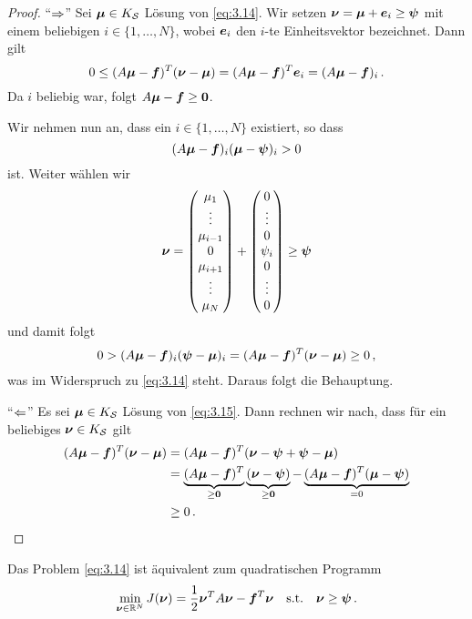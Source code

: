\begin{proof}
"`$\Rightarrow$"' Sei $\boldsymbol \mu \in K_{\mathcal S}$ Lösung von \eqref{eq:3.14}. Wir setzen $\boldsymbol\nu = \boldsymbol \mu +\boldsymbol e_i \ge \boldsymbol\psi$ mit einem beliebigen $i \in \{1,\ldots,N\}$, wobei $\boldsymbol e_i $ den $i$-te Einheitsvektor bezeichnet. Dann gilt
\[
	0 \le (A\boldsymbol\mu - \boldsymbol f)^T (\boldsymbol\nu - \boldsymbol\mu) = (A\boldsymbol\mu - \boldsymbol f)^T \boldsymbol e_i = (A\boldsymbol \mu-\boldsymbol f)_i \, .
\]
Da $i$ beliebig war, folgt $A\boldsymbol\mu - \boldsymbol f\ge \boldsymbol 0$.

Wir  nehmen nun an, dass ein $i \in \{1,\ldots,N\}$ existiert, so dass $$(A\boldsymbol\mu - \boldsymbol f)_i (\boldsymbol\mu-\boldsymbol\psi)_i >0$$ ist. Weiter wählen wir
\[
	\boldsymbol\nu = \begin{pmatrix}
				\mu_1 \\
				\vdots \\
				\mu_{i-1} \\
				0 \\
				\mu_{i+1}\\
				\vdots \\
				\mu_N
			\end{pmatrix} + 
			\begin{pmatrix}
				0 \\
				\vdots \\
				0\\
				\psi_i \\
				0\\
				\vdots \\
				0
			\end{pmatrix} \ge \boldsymbol\psi
\]
und damit folgt
\begin{align*}
	0 > (A\boldsymbol \mu - \boldsymbol f)_i (\boldsymbol\psi - \boldsymbol\mu)_i  = (A\boldsymbol\mu-\boldsymbol f)^T (\boldsymbol \nu-\boldsymbol \mu) \ge 0 \, ,
\end{align*}
was im Widerspruch zu \eqref{eq:3.14} steht. Daraus folgt die Behauptung.

"`$\Leftarrow$"' Es sei $\boldsymbol \mu \in K_{\mathcal S}$ Lösung von \eqref{eq:3.15}. Dann rechnen wir nach, dass für ein beliebiges $\boldsymbol\nu \in K_{\mathcal S}$ gilt
\begin{align*}
	(A\boldsymbol \mu-\boldsymbol f)^T (\boldsymbol \nu- \boldsymbol\mu) & = (A\boldsymbol \mu-\boldsymbol f)^T (\boldsymbol \nu -\boldsymbol \psi + \boldsymbol\psi- \boldsymbol\mu) \\
	& = \underbrace{(A\boldsymbol \mu-\boldsymbol f)^T}_{\ge \boldsymbol 0} \underbrace{(\boldsymbol \nu -\boldsymbol \psi)}_{\ge \boldsymbol 0} -\underbrace{(A\boldsymbol \mu-\boldsymbol f)^T (\boldsymbol\mu-\boldsymbol\psi)}_{=0} \\
	& \ge 0\, . \qedhere
\end{align*}
\end{proof}


\begin{satz}\label{satz:3.12}
Das Problem \eqref{eq:3.14} ist äquivalent zum quadratischen Programm
\begin{align}\label{eq:3.16}
	\min_{\boldsymbol\nu \in \mathbb{R}^N} J(\boldsymbol\nu) = \frac 1 2 \boldsymbol \nu^T A \boldsymbol \nu - \boldsymbol f^T \boldsymbol \nu\quad \text{s.t.} \quad \boldsymbol \nu \ge \boldsymbol \psi \, .
\end{align}
\end{satz}


